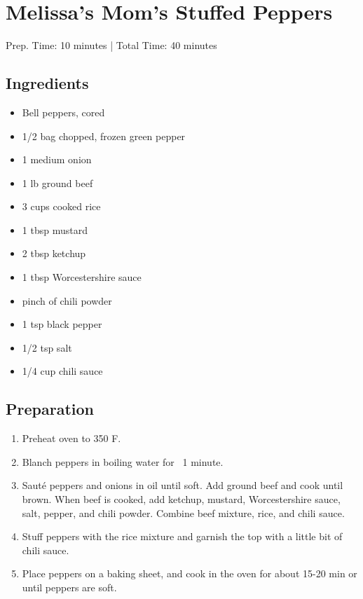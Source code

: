 \section{Melissa's Mom's Stuffed Peppers}

Prep. Time: 10 minutes |
Total Time: 40 minutes

\subsection{Ingredients}
\begin{multicols}{2}
\begin{itemize}
    \item Bell peppers, cored
    \item 1/2 bag chopped, frozen green pepper
    \item 1 medium onion
    \item 1 lb ground beef
    \item 3 cups cooked rice
    \item 1 tbsp mustard
    \item 2 tbsp ketchup
    \item 1 tbsp Worcestershire sauce
    \item pinch of chili powder
    \item 1 tsp black pepper
    \item 1/2 tsp salt
    \item 1/4 cup chili sauce
\end{itemize}
\end{multicols}

\subsection{Preparation}
\begin{enumerate}
    \item Preheat oven to 350 F.
    \item Blanch peppers in boiling water for ~1 minute.
    \item Saut\'{e} peppers and onions in oil until soft. Add ground beef and cook until brown. When beef is cooked, add ketchup, mustard, Worcestershire sauce, salt, pepper, and chili powder. Combine beef mixture, rice, and chili sauce.
    \item Stuff peppers with the rice mixture and garnish the top with a little bit of chili sauce.
    \item Place peppers on a baking sheet, and cook in the oven for about 15-20 min or until peppers are soft.
\end{enumerate}
